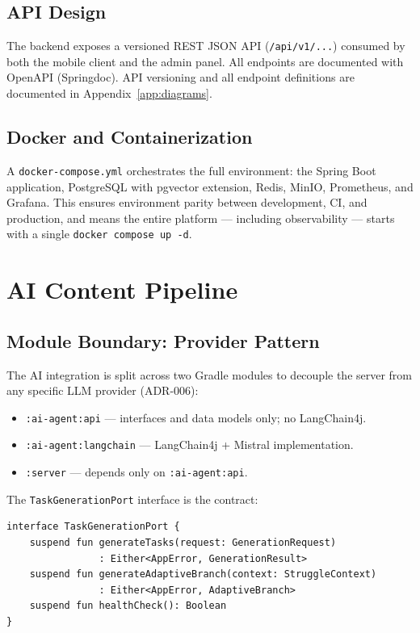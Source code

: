 \subsection{API Design}
\label{ssec:api_design}

The backend exposes a versioned REST JSON API (\texttt{/api/v1/...}) consumed by both the mobile client and the admin panel. All endpoints are documented with OpenAPI (Springdoc). API versioning and all endpoint definitions are documented in Appendix~\ref{app:diagrams}.

\subsection{Docker and Containerization}
\label{ssec:docker}

A \texttt{docker-compose.yml} orchestrates the full environment: the Spring Boot application, PostgreSQL with pgvector extension, Redis, MinIO, Prometheus, and Grafana. This ensures environment parity between development, CI, and production, and means the entire platform — including observability — starts with a single \texttt{docker compose up -d}.

\section{AI Content Pipeline}
\label{sec:ai_module}

\subsection{Module Boundary: Provider Pattern}
\label{ssec:ai_module_boundary}

The AI integration is split across two Gradle modules to decouple the server from any specific LLM provider (ADR-006):

\begin{itemize}
    \item \texttt{:ai-agent:api} — interfaces and data models only; no LangChain4j.
    \item \texttt{:ai-agent:langchain} — LangChain4j + Mistral implementation.
    \item \texttt{:server} — depends only on \texttt{:ai-agent:api}.
\end{itemize}

The \texttt{TaskGenerationPort} interface is the contract:

\begin{verbatim}
interface TaskGenerationPort {
    suspend fun generateTasks(request: GenerationRequest)
                : Either<AppError, GenerationResult>
    suspend fun generateAdaptiveBranch(context: StruggleContext)
                : Either<AppError, AdaptiveBranch>
    suspend fun healthCheck(): Boolean
}
\end{verbatim}

